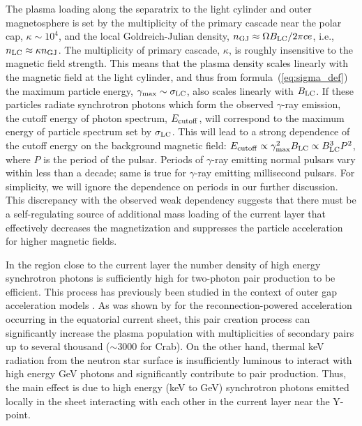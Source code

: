 The plasma loading along the separatrix to the light cylinder and outer magnetosphere is set by the multiplicity of the primary cascade near the polar cap, $\kappa\sim 10^4$, \citep{1982ApJ...252..337D,2013MNRAS.429...20T,2018arXiv180308924T} and the local Goldreich-Julian density, $n_{\rm GJ}\approx\Omega B_{\rm LC}/2\pi c e$, i.e., $n_{\rm LC}\approx \kappa n_{\rm GJ}$. The multiplicity of primary cascade, $\kappa$, is roughly insensitive to the magnetic field strength. This means that the plasma density scales linearly with the magnetic field at the light cylinder, and thus from formula~(\ref{eq:sigma_def}) the maximum particle energy, $\gamma_{\rm max}\sim \sigma_{\rm LC}$, also scales linearly with $B_{\rm LC}$. If these particles radiate synchrotron photons which form the observed $\gamma$-ray emission, the cutoff energy of photon spectrum, $E_{\rm cutoff}$, will correspond to the maximum energy of particle spectrum set by $\sigma_{\rm LC}$. This will lead to a strong dependence of the cutoff energy on the background magnetic field: $E_{\rm cutoff}\propto \gamma_{\rm max}^2 B_{\rm LC}\propto B_{\rm LC}^3P^2$, where $P$ is the period of the pulsar. Periods of $\gamma$-ray emitting normal pulsars vary within less than a decade; same is true for $\gamma$-ray emitting millisecond pulsars. For simplicity, we will ignore the dependence on periods in our further discussion. This discrepancy with the observed weak dependency suggests that there must be a self-regulating source of additional mass loading of the current layer that effectively decreases the magnetization and suppresses the particle acceleration for higher magnetic fields.

In the region close to the current layer the number density of high energy synchrotron photons is sufficiently high for two-photon pair production to be efficient. This process has previously been studied in the context of outer gap acceleration models \citep{1996A&AS..120C..49A, 2010ApJ...715.1318T}. As was shown by \cite{1996A&A...311..172L} for the reconnection-powered acceleration occurring in the equatorial current sheet, this pair creation process can significantly increase the plasma population with multiplicities of secondary pairs up to several thousand ($\sim 3000$ for Crab). On the other hand, thermal keV radiation from the neutron star surface is insufficiently luminous to interact with high energy GeV photons and significantly contribute to pair production. Thus, the main effect is due to high energy (keV to GeV) synchrotron photons emitted locally in the sheet interacting with each other in the current layer near the Y-point.

